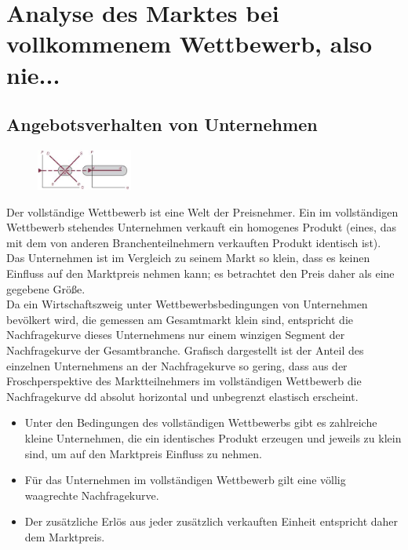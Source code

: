 \documentclass[10pt]{scrartcl}
\begin{document}
\section{Analyse des Marktes bei vollkommenem Wettbewerb, also nie...}
\subsection{Angebotsverhalten von Unternehmen}
\begin{figure}
  \begin{center}
    \includegraphics[width=0.28\textwidth]{img/nachfrage_voll_wett.jpg}
  \end{center}
\end{figure}
Der vollständige Wettbewerb ist eine Welt der Preisnehmer. Ein im vollständigen Wettbewerb stehendes Unternehmen verkauft ein homogenes Produkt (eines, das mit dem von anderen Branchenteilnehmern verkauften Produkt identisch ist). Das Unternehmen ist im Vergleich zu seinem Markt so klein, dass es keinen Einfluss auf den Marktpreis nehmen kann; es betrachtet den Preis daher als eine gegebene Größe.\\
Da ein Wirtschaftszweig unter Wettbewerbsbedingungen von Unternehmen bevölkert wird, die gemessen am Gesamtmarkt klein sind, entspricht die Nachfragekurve dieses Unternehmens nur einem winzigen Segment der Nachfragekurve der Gesamtbranche. Grafisch dargestellt ist der Anteil des einzelnen Unternehmens an der Nachfragekurve so gering, dass aus der Froschperspektive des Marktteilnehmers im vollständigen Wettbewerb die Nachfragekurve dd absolut horizontal und unbegrenzt elastisch erscheint.\\
\begin{itemize}
\item Unter den Bedingungen des vollständigen Wettbewerbs gibt es zahlreiche kleine Unternehmen, die ein identisches Produkt erzeugen und jeweils zu klein sind, um auf den Marktpreis Einfluss zu nehmen. 
\item Für das Unternehmen im vollständigen Wettbewerb gilt eine völlig waagrechte Nachfragekurve.
\item Der zusätzliche Erlös aus jeder zusätzlich verkauften Einheit entspricht daher dem Marktpreis.
\end{itemize} 
\end{document}

